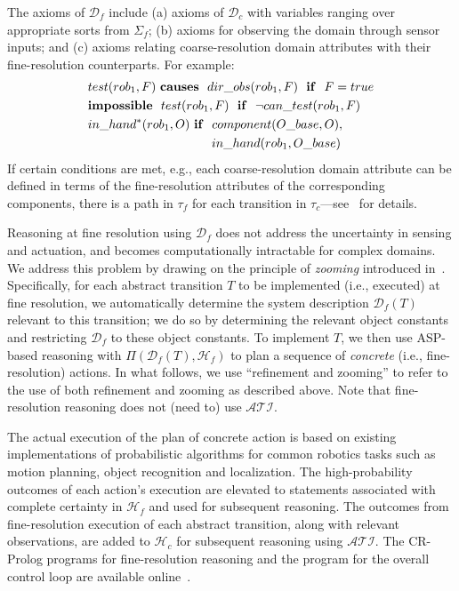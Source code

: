 \documentclass[letterpaper, 10 pt, conference]{article}  %
\begin{document}
The axioms of $\mathcal{D}_f$ include (a) axioms of $\mathcal{D}_c$
with variables ranging over appropriate sorts from $\Sigma_f$; (b)
axioms for observing the domain through sensor inputs; and (c) axioms
relating coarse-resolution domain attributes with their
fine-resolution counterparts. For example:
\begin{align*}
  &test(rob_1, F) ~{\bf causes}~~dir\_obs(rob_1,F)~~{\bf if }~~F=true \\
  &{\bf impossible}~~test(rob_1, F)~~{\bf if}~~\lnot can\_test(rob_1, F) \\
  &in\_hand^*(rob_1, O) ~{\bf if}~~component(O\_base, O),\\
  &~~~~~~~~~~~~~~~~~~~~~~~~~~~~~~in\_hand(rob_1, O\_base)
\end{align*} 
If certain conditions are met, e.g., each coarse-resolution domain
attribute can be defined in terms of the fine-resolution attributes of
the corresponding components, there is a path in $\tau_f$ for each
transition in $\tau_c$---see~\cite{sridharan2017refinement} for
details.

Reasoning at fine resolution using $\mathcal{D}_f$ does not address
the uncertainty in sensing and actuation, and becomes computationally
intractable for complex domains. We address this problem by drawing on
the principle of \emph{zooming} introduced
in~\cite{sridharan2017refinement}.  Specifically, for each abstract
transition $T$ to be implemented (i.e., executed) at fine resolution,
we automatically determine the system description $\mathcal{D}_f(T)$
relevant to this transition; we do so by determining the relevant
object constants and restricting $\mathcal{D}_f$ to these object
constants. To implement $T$, we then use ASP-based reasoning with
$\Pi(\mathcal{D}_f(T), \mathcal{H}_f)$ to plan a sequence of
\emph{concrete} (i.e., fine-resolution) actions. In what follows, we
use ``refinement and zooming'' to refer to the use of both refinement
and zooming as described above. Note that fine-resolution reasoning
does not (need to) use $\mathcal{ATI}$.

The actual execution of the plan of concrete action is based on
existing implementations of probabilistic algorithms for common
robotics tasks such as motion planning, object recognition and
localization. The high-probability outcomes of each action's execution
are elevated to statements associated with complete certainty in
$\mathcal{H}_f$ and used for subsequent reasoning. The outcomes from
fine-resolution execution of each abstract transition, along with
relevant observations, are added to $\mathcal{H}_c$ for subsequent
reasoning using $\mathcal{ATI}$. The CR-Prolog programs for
fine-resolution reasoning and the program for the overall control loop
are available online~\cite{code-results}.
\end{document}
